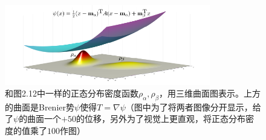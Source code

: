 \documentclass[cn,10pt,math=newtx,citestyle=gb7714-2015,bibstyle=gb7714-2015]{elegantbook}
\begin{document}
\begin{figure}[H]
    \centering
    \includegraphics[width=0.8\textwidth]{figure/fig2.13.png}
    \caption{和图2.12中一样的正态分布密度函数$\rho_\alpha, \rho_\beta$，用三维曲面图表示。上方的曲面是Brenier势$\psi$使得$T=\nabla \psi$（图中为了将两者图像分开显示，给了$\psi$的曲面一个$+50$的位移，另外为了视觉上更直观，将正态分布密度的值乘了$100$作图）}
    \label{图2.13}
\end{figure}
\end{document}
